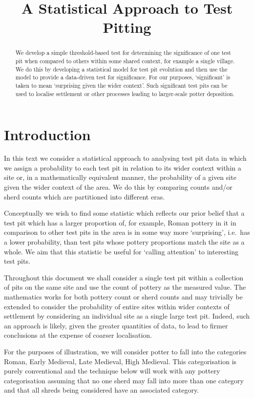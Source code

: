 \documentclass[conference]{IEEEtran}
\title{A Statistical Approach to Test Pitting}
\author{%
    \IEEEauthorblockN{Rich Wareham}
    \IEEEauthorblockA{Signal Processing and Communications Laboratory\\
    Department of Engineering, University of Cambridge\\
    Email: rjw57@cam.ac.uk}
}
\begin{document}
\maketitle

\begin{abstract}
    We develop a simple threshold-based test for determining the significance of
    one test pit when compared to others within some shared context, for example
    a single village. We do this by developing a statistical model for test pit
    evolution and then use the model to provide a data-driven test for
    significance. For our purposes, `significant' is taken to mean `surprising
    given the wider context'. Such significant test pits can be used to localise
    settlement or other processes leading to larger-scale potter deposition.
\end{abstract}

\section{Introduction}

In this text we consider a statistical approach to analysing test pit data in
which we assign a probability to each test pit in relation to its wider context
within a site or, in a mathematically equivalent manner, the probability of a
given site given the wider context of the area. We do this by comparing counts
and/or sherd counts which are partitioned into different eras.

Conceptually we wish to find some statistic which reflects our prior belief that a
test pit which has a larger proportion of, for example, Roman pottery in it in
comparison to other test pits in the area is in some way more `surprising',
i.e.\ has a lower probability, than test pits whose pottery proportions match
the site as a whole. We aim that this statistic be useful for `calling
attention' to interesting test pits.

Throughout this document we shall consider a single test pit within a collection
of pits on the same site and use the count of pottery as the measured value.
The mathematics works for both pottery count or sherd counts and may trivially
be extended to consider the probability of entire sites within wider contexts of
settlement by considering an individual site as a single large test pit. Indeed,
such an approach is likely, given the greater quantities of data, to lead to
firmer conclusions at the expense of coarser localisation.

For the purposes of illustration, we will consider potter to fall into the
categories Roman, Early Medieval, Late Medieval, High Medieval. This
categorisation is purely conventional and the technique below will work with any
pottery categorisation assuming that no one sherd may fall into more than one
category and that all shreds being considered have an associated category.
\end{document}
